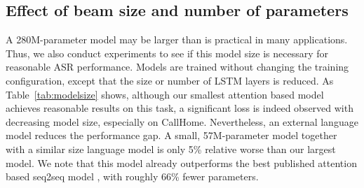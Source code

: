 \documentclass[a4paper]{article}
\begin{document}
\subsection{Effect of beam size and number of parameters}
A 280M-parameter model may be larger than is practical in many applications. Thus, we also conduct experiments to see if this model size is necessary for reasonable ASR performance.
Models are trained without changing the training configuration, except that the size or number of LSTM layers is reduced.
As Table~\ref{tab:modelsize} shows, although our smallest attention based model achieves reasonable results on this task, a significant loss is indeed observed with decreasing model size, especially on CallHome.
Nevertheless, an external language model reduces the performance gap.
A small, 57M-parameter model together with a similar size language model is only 5\% relative worse than our largest model.
We note that this model already outperforms the best published attention based seq2seq model \cite{Park2019}, with roughly 66\% fewer parameters.
\end{document}
